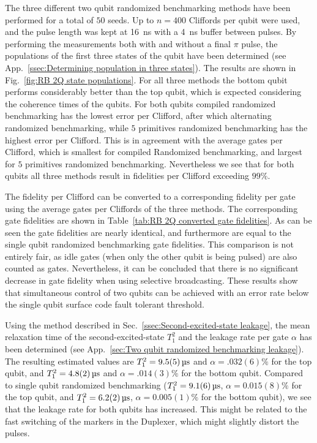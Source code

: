           The three different two qubit randomized benchmarking methods have been performed for a total of $50$ seeds. Up to $n=400$ Cliffords per qubit were used, and the pulse length was kept at \SI{16}{\nano \second} with a \SI{4}{\nano \second} buffer between pulses. By performing the measurements both with and without a final $\pi$ pulse, the populations of the first three states of the qubit have been determined (see App.~\ref{ssec:Determining population in three states}). The results are shown in Fig.~\ref{fig:RB 2Q state populations}. For all three methods the bottom qubit performs considerably better than the top qubit, which is expected considering the coherence times of the qubits. For both qubits compiled randomized benchmarking has the lowest error per Clifford, after which alternating randomized benchmarking, while $5$ primitives randomized benchmarking has the highest error per Clifford. This is in agreement with the average gates per Clifford, which is smallest for compiled Randomized benchmarking, and largest for $5$ primitives randomized benchmarking. Nevertheless we see that for both qubits all three methods result in fidelities per Clifford exceeding $99\%$.

          The fidelity per Clifford can be converted to a corresponding fidelity per gate using the average gates per Cliffords of the three methods. The corresponding gate fidelities are shown in Table~\ref{tab:RB 2Q converted gate fidelities}. As can be seen the gate fidelities are nearly identical, and furthermore are equal to the single qubit randomized benchmarking gate fidelities. This comparison is not entirely fair, as idle gates (when only the other qubit is being pulsed) are also counted as gates. Nevertheless, it can be concluded that there is no significant decrease in gate fidelity when using selective broadcasting. These results show that simultaneous control of two qubits can be achieved with an error rate below the single qubit surface code fault tolerant threshold.

          Using the method described in Sec.~\ref{ssec:Second-excited-state leakage}, the mean relaxation time of the second-excited-state $T_1^2$ and the leakage rate per gate $\alpha$ has been determined (see App.~\ref{sec:Two qubit randomized benchmarking leakage}). The resulting estimated values are $T_1^2=\SIm{9.5(5)}{\micro \second}$ and $\alpha=.032(6)\%$ for the top qubit, and $T_1^2=\SIm{4.8(2)}{\micro \second}$ and $\alpha=.014(3)\%$ for the bottom qubit. Compared to single qubit randomized benchmarking ($T_1^2=\SIm{9.1(6)}{\micro \second}$, $\alpha=0.015(8)\%$ for the top qubit, and $T_1^2=\SIm{6.2(2)}{\micro \second}$, $\alpha=0.005(1)\%$ for the bottom qubit), we see that the leakage rate for both qubits has increased. This might be related to the fast switching of the markers in the Duplexer, which might slightly distort the pulses.

